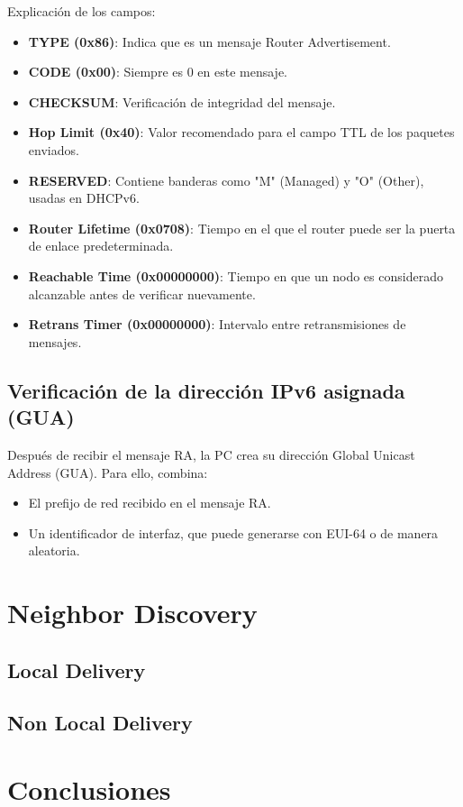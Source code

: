 \documentclass[]{article}
\begin{document}
	Explicación de los campos:
	
	\begin{itemize}
		\item \textbf{TYPE (0x86)}: Indica que es un mensaje Router Advertisement.
		\item \textbf{CODE (0x00)}: Siempre es 0 en este mensaje.
		\item \textbf{CHECKSUM}: Verificación de integridad del mensaje.
		\item \textbf{Hop Limit (0x40)}: Valor recomendado para el campo TTL de los paquetes enviados.
		\item \textbf{RESERVED}: Contiene banderas como "M" (Managed) y "O" (Other), usadas en DHCPv6.
		\item \textbf{Router Lifetime (0x0708)}: Tiempo en el que el router puede ser la puerta de enlace predeterminada.
		\item \textbf{Reachable Time (0x00000000)}: Tiempo en que un nodo es considerado alcanzable antes de verificar nuevamente.
		\item \textbf{Retrans Timer (0x00000000)}: Intervalo entre retransmisiones de mensajes.
	\end{itemize}
	
	\subsection{\textbf{Verificación de la dirección IPv6 asignada (GUA)}}
	
	Después de recibir el mensaje RA, la PC crea su dirección Global Unicast Address (GUA).  
	Para ello, combina:
	
	\begin{itemize}
		\item El prefijo de red recibido en el mensaje RA.
		\item Un identificador de interfaz, que puede generarse con EUI-64 o de manera aleatoria.
	\end{itemize}
	
	\section{\textbf{Neighbor Discovery}}
	
	\subsection{\textbf{Local Delivery}}
	
	\subsection{\textbf{Non Local Delivery}}
	
	\section{\textbf{Conclusiones}}
	
\end{document}
